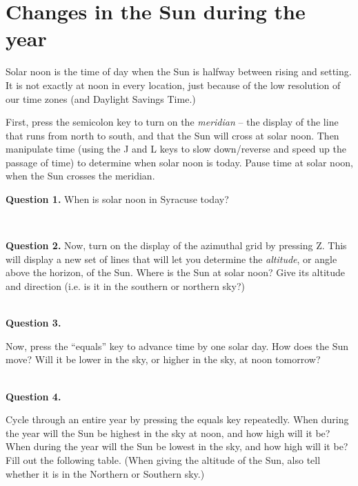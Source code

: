 \documentclass[11pt]{article}
\begin{document}
\newpage

\section{Changes in the Sun during the year}

Solar noon is the time of day when the Sun is halfway between rising and setting. It is not exactly at noon in every location, just because of the low resolution of our time zones (and Daylight Savings Time.) 

First, press the semicolon key to turn on the {\it meridian} -- the display of the line that runs from north to south, and that the Sun will cross at solar noon. Then manipulate time (using the J and L keys to slow down/reverse and speed up the passage
of time) to determine when solar noon is today. Pause time at solar noon, when the Sun crosses the meridian.

\textbf{Question 1.} When is solar noon in Syracuse today? 
\vspace*{1.5cm}

\hrulefill\\
\noindent

\noindent \textbf{Question 2.} 
Now, turn on the display of the azimuthal grid by pressing Z. This will display a new set of lines that will let you determine the {\it altitude}, or angle above the horizon, of the Sun. Where is the Sun at solar noon? Give its altitude and 
direction (i.e. is it in the southern or northern sky?)

\vspace*{1.5cm}

\hrulefill\\
\noindent
\newpage
\textbf{Question 3.} 

Now, press the ``equals'' key to advance time by one solar day. How does the Sun move? Will it be lower in the sky, or 
higher in the sky, at noon tomorrow?

\vspace*{1.5cm}

\hrulefill\\
\textbf{Question 4.} 

Cycle through an entire year by pressing the equals key repeatedly. When during the year will the Sun be highest in the sky
at noon, and how high will it be? When during the year will the Sun be lowest in the sky, and how high will it be? Fill out 
the following table.
(When giving the altitude of the Sun, also tell whether it is in the Northern or Southern sky.) 
\renewcommand{\arraystretch}{2}
\end{document}
